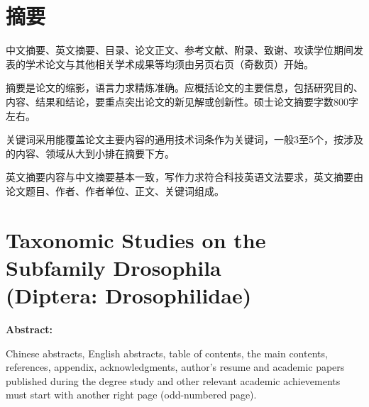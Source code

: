 \makeTitle%

\makeDeclaration%

\chapter*{摘\quad\quad 要}
\setcounter{page}{1}

中文摘要、英文摘要、目录、论文正文、参考文献、附录、致谢、攻读学位期间发表的学术论文与其他相关学术成果等均须由另页右页（奇数页）开始。

摘要是论文的缩影，语言力求精炼准确。应概括论文的主要信息，包括研究目的、内容、结果和结论，要重点突出论文的新见解或创新性。硕士论文摘要字数800字左右。

关键词采用能覆盖论文主要内容的通用技术词条作为关键词，一般3至5个，按涉及的内容、领域从大到小排在摘要下方。

英文摘要内容与中文摘要基本一致，写作力求符合科技英语文法要求，英文摘要由论文题目、作者、作者单位、正文、关键词组成。



\chapter*{Taxonomic Studies on the Subfamily Drosophila\\(Diptera: Drosophilidae)}

{
    \vspace{\baselineskip}
    \noindent\bfseries{Abstract:}
}

Chinese abstracts, English abstracts, table of contents, the main contents, references, appendix, acknowledgments, author's resume and academic papers published during the degree study and other relevant academic achievements must start with another right page (odd-numbered page).


\cleardoublepage\pagestyle{frontmatterstyle}
